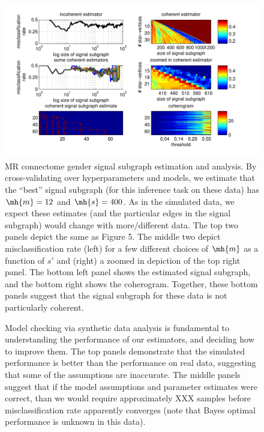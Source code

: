 \documentclass[10pt,journal,cspaper,compsoc]{IEEEtran}
\begin{document}
\begin{figure}[htbp]
	\centering
		\includegraphics[width=1.0\linewidth]{../figs/BLSA0317_Count_Lhats.pdf}
	\caption{MR connectome gender signal subgraph estimation and analysis. By cross-validating over hyperparameters and models, we estimate that the ``best'' signal subgraph (for this inference task on these data) has $\mh{m}=12$ and $\mh{s}=400$.  As in the simulated data, we expect these estimates (and the particular edges in the signal subgraph) would change with more/different data. The top two panels depict the same as Figure 5.  The middle two depict misclassification rate (left) for a few different choices of $\mh{m}$ as a function of $s'$ and (right) a zoomed in depiction of the top right panel. The bottom left panel shows the estimated signal subgraph, and the bottom right shows the coherogram.  Together, these bottom panels suggest that the signal subgraph for these data is not particularly coherent.}
	\label{fig:data}
\end{figure}


\begin{figure}[htbp]
	\centering
	\caption{Model checking via synthetic data analysis is fundamental to understanding the performance of our estimators, and deciding how to improve them.  The top panels demonstrate that the simulated performance is better than the performance on real data, suggesting that some of the assumptions are inaccurate.  The middle panels suggest that if the model assumptions and parameter estimates were correct, than we would require approximately XXX samples before misclassification rate apparently converges (note that Bayes optimal performance is unknown in this data).}
	\label{fig:synthetic}
\end{figure}
\end{document}
